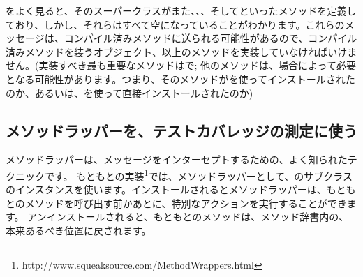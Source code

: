 \documentclass[a4paper,10pt,twoside]{book}
\begin{document}
をよく見ると、そのスーパークラスがまた、、、そしてといったメソッドを定義しており、しかし、それらはすべて空になっていることがわかります。これらのメッセージは、コンパイル済みメソッドに送られる可能性があるので、コンパイル済みメソッドを装うオブジェクト、以上のメソッドを実装していなければいけません。(実装すべき最も重要なメソッドはで; 他のメソッドは、場合によって必要となる可能性があります。つまり、そのメソッドがを使ってインストールされたのか、あるいは、を使って直接インストールされたのか) %

\subsection{メソッドラッパーを、テストカバレッジの測定に使う}

メソッドラッパーは、メッセージをインターセプトするための、よく知られたテクニックです\cite{Bran98a}。
もともとの実装\footnote{http://www.squeaksource.com/MethodWrappers.html}では、メソッドラッパーとして、のサブクラスのインスタンスを使います。インストールされるとメソッドラッパーは、もともとのメソッドを呼び出す前かあとに、特別なアクションを実行することができます。
アンインストールされると、もともとのメソッドは、メソッド辞書内の、本来あるべき位置に戻されます。
\end{document}
